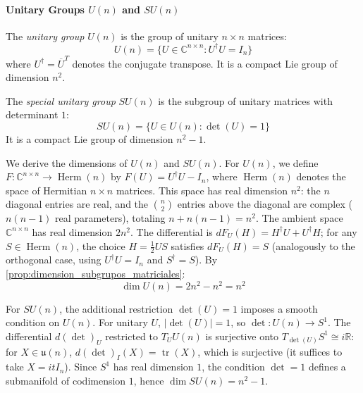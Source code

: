 \paragraph{Unitary Groups $U(n)$ and $SU(n)$}

\begin{definition}\label{def:grupo_u_n}
The \textit{unitary group} $U(n)$ is the group of unitary $n \times n$ matrices:
\begin{equation}
U(n) = \{U \in \mathbb{C}^{n \times n} : U^\dagger U = I_n\}
\end{equation}
where $U^\dagger = \overline{U}^T$ denotes the conjugate transpose. It is a compact Lie group of dimension $n^2$.
\end{definition}

\begin{definition}\label{def:grupo_su_n}
The \textit{special unitary group} $SU(n)$ is the subgroup of unitary matrices with determinant $1$:
\begin{equation}
SU(n) = \{U \in U(n) : \det(U) = 1\}
\end{equation}
It is a compact Lie group of dimension $n^2 - 1$.
\end{definition}

We derive the dimensions of $U(n)$ and $SU(n)$. For $U(n)$, we define $F: \mathbb{C}^{n \times n} \to \operatorname{Herm}(n)$ by $F(U) = U^\dagger U - I_n$, where $\operatorname{Herm}(n)$ denotes the space of Hermitian $n \times n$ matrices. This space has real dimension $n^2$: the $n$ diagonal entries are real, and the $\binom{n}{2}$ entries above the diagonal are complex ($n(n-1)$ real parameters), totaling $n + n(n-1) = n^2$. The ambient space $\mathbb{C}^{n \times n}$ has real dimension $2n^2$. The differential is $dF_U(H) = H^\dagger U + U^\dagger H$; for any $S \in \operatorname{Herm}(n)$, the choice $H = \frac{1}{2}US$ satisfies $dF_U(H) = S$ (analogously to the orthogonal case, using $U^\dagger U = I_n$ and $S^\dagger = S$). By \autoref{prop:dimension_subgrupos_matriciales}:
\[
	\dim U(n) = 2n^2 - n^2 = n^2
\]

For $SU(n)$, the additional restriction $\det(U) = 1$ imposes a smooth condition on $U(n)$. For unitary $U$, $|\det(U)| = 1$, so $\det: U(n) \to S^1$. The differential $d(\det)_U$ restricted to $T_U U(n)$ is surjective onto $T_{\det(U)}S^1 \cong i\mathbb{R}$: for $X \in \mathfrak{u}(n)$, $d(\det)_I(X) = \operatorname{tr}(X)$, which is surjective (it suffices to take $X = itI_n$). Since $S^1$ has real dimension $1$, the condition $\det = 1$ defines a submanifold of codimension $1$, hence $\dim SU(n) = n^2 - 1$.

